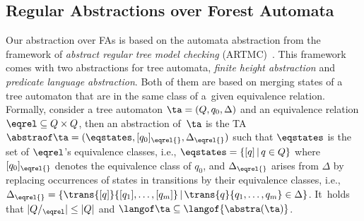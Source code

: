 \subsection{Regular Abstractions over Forest Automata}\label{sec:abstraction}

Our abstraction over FAs is based on the automata abstraction
from the framework of \emph{abstract regular tree model checking}
(ARTMC)~\cite{artmc}.
This framework comes with two abstractions for tree automata, 
\emph{finite height abstraction} and \emph{predicate language abstraction}.
Both of them are based on merging states of a tree automaton that are in the
same class 
of a~given equivalence relation. 
%
Formally, consider a tree automaton $\ta=(Q, q_0, \Delta)$ and an equivalence
relation ${\eqrel} \subseteq Q \times Q$,
then an abstraction of~$\ta$ is
%
%
%
the TA $\abstraof \ta =( \eqstates,[q_0]_{\eqrel{}},\Delta_{\eqrel{}} )$
such that $\eqstates$ is the set of
$\eqrel$'s equivalence classes, i.e., $\eqstates = \{[q]\,|\, q\in Q\}$ where
$[q_0]_{\eqrel{}}$ denotes the equivalence class
of $q_0$,  and $\Delta_{\eqrel{}}$ arises from $\Delta$ by replacing
occurrences of states in transitions by their equivalence classes, i.e., $\Delta_{\eqrel{}}=\{\trans{[q]}{[q_1], \dots, [q_m]}
\,|\, \trans{q}{q_1, \dots, q_m} \in \Delta\}$.
%
%
It~holds that $|Q/_{\eqrel}| \leq |Q|$ and
$\langof \ta \subseteq \langof{\abstra(\ta)}$.
%

